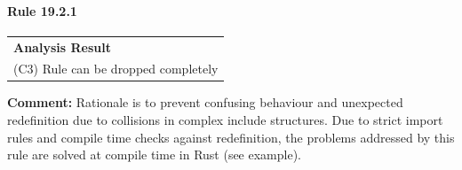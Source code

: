 \paragraph{Rule 19.2.1}
\begin{longtable}{p{13cm}}
\textbf{Analysis Result} \\
(C3) Rule can be dropped completely \\
\end{longtable}
\textbf{Comment:} Rationale is to prevent confusing behaviour and unexpected redefinition due to collisions in complex include structures. Due to strict import rules and compile time checks against redefinition, the problems addressed by this rule are solved at compile time in Rust (see example). \\



